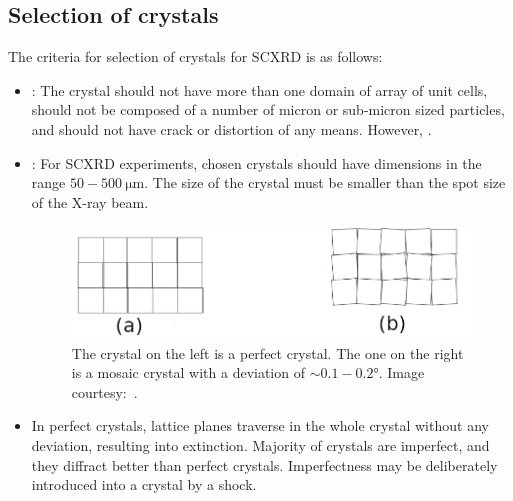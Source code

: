 \subsection{Selection of crystals}

The criteria for selection of crystals for SCXRD is as follows:%
%			
	\begin{itemize}%
%			
	    \item {}: The crystal should not have more than one domain of array of unit cells, should not be composed of a number of micron or sub-micron sized particles, and should not have crack or distortion of any means. However, .
	    
	    \item {}: For SCXRD experiments, chosen crystals should have dimensions in the range $50-500~\si{\micro\metre}.$ The size of the crystal must be smaller than the spot size of the X-ray beam.
	    
	    \begin{figure}
	    	\centering
	    	\includegraphics[scale=0.5]{imperfect_crystal.png}
	    	\caption{\label{fig:imperfect_crystal}The crystal on the left is a perfect crystal. The one on the right is a mosaic crystal with a deviation of $\sim 0.1-0.2 \si{\degree}.$ Image courtesy:~\cite{Chowdhury2022}.}
	    \end{figure}
	    
	    \item {} In perfect crystals, lattice planes traverse in the whole crystal without any deviation, resulting into extinction. Majority of crystals are imperfect, and they diffract better than perfect crystals. Imperfectness may be deliberately introduced into a crystal by a shock.
	    

\end{itemize}
